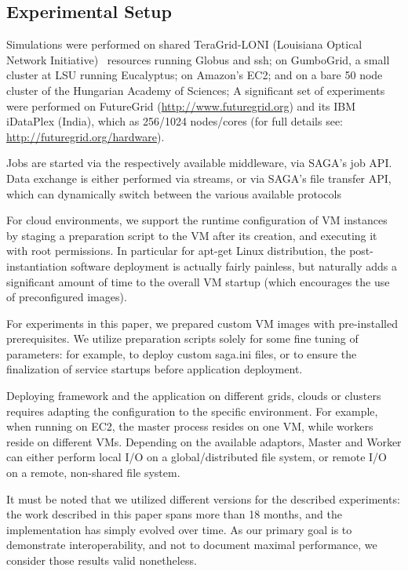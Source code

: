 \documentclass[3p,twocolumn]{elsarticle}
\begin{document}
\subsection{Experimental Setup}

Simulations were performed on shared TeraGrid-LONI (Louisiana Optical
Network Initiative)~\cite{loni-url} resources running Globus and ssh;
on GumboGrid, a small cluster at LSU running Eucalyptus; on Amazon's
EC2; and on a bare 50 node cluster of the Hungarian Academy of Sciences;
A significant set of experiments were performed on FutureGrid
(\url{http://www.futuregrid.org}) and its IBM iDataPlex (India), which
as 256/1024 nodes/cores (for full details see:
\url{http://futuregrid.org/hardware}).

Jobs are started via the respectively available middleware, via
SAGA's job API.  Data exchange is either performed via streams, or via
SAGA's file transfer API, which can dynamically switch between the
various available protocols 

For cloud environments, we support the runtime configuration of VM
instances by staging a preparation script to the VM after its
creation, and executing it with root permissions.  In particular for
apt-get  Linux distribution, the
post-instantiation software deployment is actually fairly painless,
but naturally adds a significant amount of time to the overall VM
startup (which encourages the use of preconfigured images).

For experiments in this paper, we prepared custom VM images with
pre-installed prerequisites.  We utilize preparation scripts solely
for some fine tuning of parameters: for example, to deploy custom
saga.ini files, or to ensure the finalization of service startups
before application deployment.

Deploying \sagamapreduce framework and the \wc application on
different grids, clouds or clusters requires adapting the configuration
to the specific environment.  For example, when running \sagamapreduce
on EC2, the master process resides on one VM, while workers reside on
different VMs.  Depending on the available adaptors, Master and Worker
can either perform local I/O on a global/distributed file system, or
remote I/O on a remote, non-shared file system.

It must be noted that we utilized different \smr versions for the
described experiments: the work described in this paper spans more
than 18 months, and the \smr implementation has simply evolved over
time.  As our primary goal is to demonstrate interoperability, and not
to document maximal performance, we consider those results valid
nonetheless.
\end{document}
